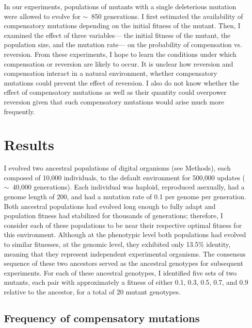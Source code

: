 \begin{doublespace}
In our experiments, populations of mutants
with a single deleterious mutation
were allowed to evolve for $\sim$~850 generations.
%
I first estimated the availability of compensatory mutations
depending on the initial fitness of the mutant.
%
Then, I examined the effect of three variables---%
the initial fitness of the mutant, the population size,
and the mutation rate---%
on the probability of compensation vs. reversion.
%
From these experiments, I hope to learn the conditions under which
compensation or reversion are likely to occur.
%
It is unclear how reversion and compensation interact in a natural environment,
whether compensatory mutations could prevent the effect of reversion.
%
I also do not know whether the effect of compensatory mutations
as well as their quantity could overpower reversion given that
such compensatory mutations would arise much more frequently.



\section{Results}

I evolved two ancestral populations of digital organisms (see Methods),
each composed of 10,000 individuals,
to the default environment for 500,000 updates ($\sim$~40,000 generations).
%
Each individual was haploid, reproduced asexually,
had a genome length of 200, and had a mutation rate of 0.1
per genome per generation.
%
Both ancestral populations had evolved long enough to fully adapt
and population fitness had stabilized for thousands of generations;
therefore, I consider each of these populations
to be near their respective optimal fitness for this environment.
%
Although at the phenotypic level both populations
had evolved to similar fitnesses,
at the genomic level, they exhibited only 13.5\% identity,
meaning that they represent independent experimental organisms.
%
The consensus sequence of these two ancestors served
as the ancestral genotypes for subsequent experiments.
%
For each of these ancestral genotypes,
I identified five sets of two mutants,
each pair with approximately a fitness of either
0.1, 0.3, 0.5, 0.7, and 0.9 relative to the ancestor,
for a total of 20 mutant genotypes.



\subsection{Frequency of compensatory mutations}


\end{doublespace}
